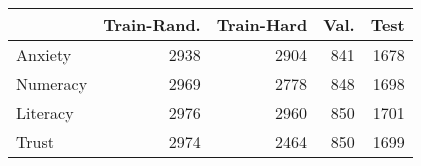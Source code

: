 \begin{tabular}{lrrrr}
\toprule
 & Train-Rand. & Train-Hard & Val. & Test \\
\midrule
Anxiety & 2938 & 2904 & 841 & 1678 \\
Numeracy & 2969 & 2778 & 848 & 1698 \\
Literacy & 2976 & 2960 & 850 & 1701 \\
Trust & 2974 & 2464 & 850 & 1699 \\
\bottomrule
\end{tabular}

